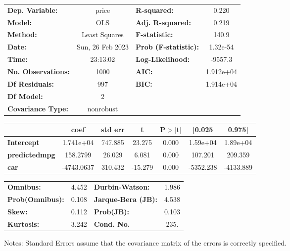 \begin{center}
\begin{tabular}{lclc}
\toprule
\textbf{Dep. Variable:}    &      price       & \textbf{  R-squared:         } &     0.220   \\
\textbf{Model:}            &       OLS        & \textbf{  Adj. R-squared:    } &     0.219   \\
\textbf{Method:}           &  Least Squares   & \textbf{  F-statistic:       } &     140.9   \\
\textbf{Date:}             & Sun, 26 Feb 2023 & \textbf{  Prob (F-statistic):} &  1.32e-54   \\
\textbf{Time:}             &     23:13:02     & \textbf{  Log-Likelihood:    } &   -9557.3   \\
\textbf{No. Observations:} &        1000      & \textbf{  AIC:               } & 1.912e+04   \\
\textbf{Df Residuals:}     &         997      & \textbf{  BIC:               } & 1.914e+04   \\
\textbf{Df Model:}         &           2      & \textbf{                     } &             \\
\textbf{Covariance Type:}  &    nonrobust     & \textbf{                     } &             \\
\bottomrule
\end{tabular}
\begin{tabular}{lcccccc}
                      & \textbf{coef} & \textbf{std err} & \textbf{t} & \textbf{P$> |$t$|$} & \textbf{[0.025} & \textbf{0.975]}  \\
\midrule
\textbf{Intercept}    &    1.741e+04  &      747.885     &    23.275  &         0.000        &     1.59e+04    &     1.89e+04     \\
\textbf{predictedmpg} &     158.2799  &       26.029     &     6.081  &         0.000        &      107.201    &      209.359     \\
\textbf{car}          &   -4743.0637  &      310.432     &   -15.279  &         0.000        &    -5352.238    &    -4133.889     \\
\bottomrule
\end{tabular}
\begin{tabular}{lclc}
\textbf{Omnibus:}       &  4.452 & \textbf{  Durbin-Watson:     } &    1.986  \\
\textbf{Prob(Omnibus):} &  0.108 & \textbf{  Jarque-Bera (JB):  } &    4.538  \\
\textbf{Skew:}          &  0.112 & \textbf{  Prob(JB):          } &    0.103  \\
\textbf{Kurtosis:}      &  3.242 & \textbf{  Cond. No.          } &     235.  \\
\bottomrule
\end{tabular}
\end{center}

Notes: \newline
 [1] Standard Errors assume that the covariance matrix of the errors is correctly specified.